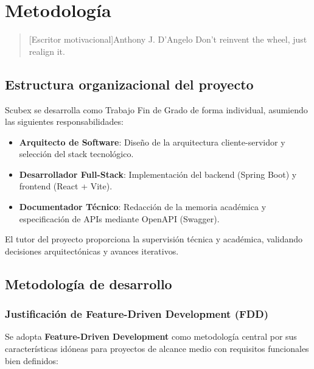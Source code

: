 \chapter{Metodología}

\begin{quotation}[Escritor motivacional]{Anthony J. D'Angelo}
Don't reinvent the wheel, just realign it.
\end{quotation}

\begin{abstract}
Este capítulo describe el marco metodológico adoptado para el desarrollo de Scubex, basado en Feature-Driven Development (FDD) con adaptaciones específicas para un proyecto académico individual. 
\end{abstract}

\section{Estructura organizacional del proyecto}

Scubex se desarrolla como Trabajo Fin de Grado de forma individual, asumiendo las siguientes responsabilidades:

\begin{itemize}
    \item \textbf{Arquitecto de Software}: Diseño de la arquitectura cliente-servidor y selección del stack tecnológico.
    \item \textbf{Desarrollador Full-Stack}: Implementación del backend (Spring Boot) y frontend (React + Vite).
    \item \textbf{Documentador Técnico}: Redacción de la memoria académica y especificación de APIs mediante OpenAPI (Swagger).
\end{itemize}

El tutor del proyecto proporciona la supervisión técnica y académica, validando decisiones arquitectónicas y avances iterativos.

\section{Metodología de desarrollo}

\subsection{Justificación de Feature-Driven Development (FDD)}

Se adopta \textbf{Feature-Driven Development} como metodología central por sus características idóneas para proyectos de alcance medio con requisitos funcionales bien definidos:

